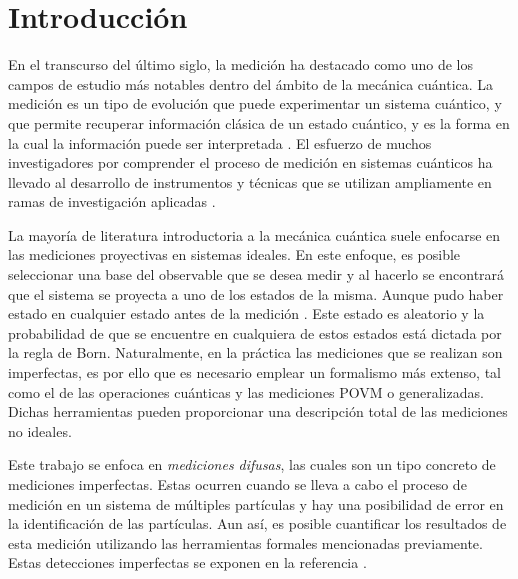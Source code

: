 \chapter[INTRODUCCIÓN]{Introducción}

En el transcurso del último siglo, la medición ha destacado como uno de los campos de estudio más notables dentro del ámbito de la mecánica cuántica. La medición es un tipo de evolución que puede experimentar un sistema cuántico, y que permite recuperar información clásica de un estado cuántico, y es la forma en la cual la información puede ser interpretada {\cite{wilde2011classical}}. El esfuerzo de muchos investigadores por comprender el proceso de medición en sistemas cuánticos ha llevado al desarrollo de instrumentos y técnicas que se utilizan ampliamente en ramas de investigación aplicadas {\cite{de2019introduction}}. %


 La mayoría de literatura introductoria a la mecánica cuántica suele enfocarse en las mediciones proyectivas en sistemas ideales. En este enfoque, es posible seleccionar una base del observable que se desea medir y al hacerlo se encontrará que el sistema se proyecta a uno de los estados de la misma. Aunque pudo haber estado en cualquier estado antes de la medición {\cite{jacobs2014quantum}}. Este estado es aleatorio y la probabilidad de que se encuentre en cualquiera de estos estados está dictada por la regla de Born. Naturalmente, en la práctica las mediciones que se realizan son imperfectas, es por ello que es necesario emplear un formalismo más extenso, tal como el de las operaciones cuánticas y las mediciones POVM o generalizadas. Dichas herramientas pueden proporcionar una descripción total de las mediciones no ideales. %



 Este trabajo se enfoca en \textit{mediciones difusas}, las cuales son un tipo concreto de mediciones imperfectas. Estas ocurren cuando se lleva a cabo el proceso de medición en un sistema de múltiples partículas y hay una posibilidad de error en la identificación de las partículas. Aun así, es posible cuantificar los resultados de esta medición utilizando las herramientas formales mencionadas previamente. Estas detecciones imperfectas se exponen en la referencia {\cite{Pineda_2021}}.%



